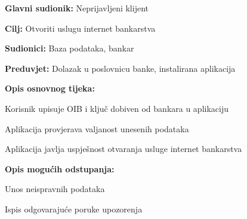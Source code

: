 			
				\noindent {}
			\begin{packed_item}
				
				\item \textbf{Glavni sudionik: }Neprijavljeni klijent
				\item  \textbf{Cilj:} Otvoriti uslugu internet bankarstva
				\item  \textbf{Sudionici:} Baza podataka, bankar
				\item  \textbf{Preduvjet:} Dolazak u poslovnicu banke, instalirana aplikacija
				\item  \textbf{Opis osnovnog tijeka:}
				
				\item[] \begin{packed_enum}
					
					\item Korisnik upisuje OIB i ključ dobiven od bankara u aplikaciju
					\item Aplikacija provjerava valjanost unesenih podataka
					\item Aplikacija javlja uspješnost otvaranja usluge internet bankarstva
					
				\end{packed_enum}
					
						\item  \textbf{Opis mogućih odstupanja:}
					
					\item[] \begin{packed_item}
						
						\item[2.a] Unos neispravnih podataka
						\item[] \begin{packed_enum}
							
							\item Ispis odgovarajuće poruke upozorenja
							
							
						\end{packed_enum}
						
						
					\end{packed_item}
				
					
					
				
			\end{packed_item}
		
			
			
			
				

				
				
